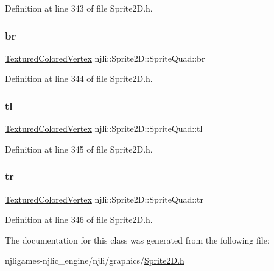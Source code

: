 Definition at line 343 of file Sprite2\+D.\+h.

\mbox{\label{classnjli_1_1_sprite2_d_1_1_sprite_quad_aa7033cec9b83bad9dfcadb89f29dcf94}} 
\subsubsection{\texorpdfstring{br}{br}}
{\footnotesize\ttfamily \mbox{\hyperlink{structnjli_1_1_geometry_1_1_textured_colored_vertex}{Textured\+Colored\+Vertex}} njli\+::\+Sprite2\+D\+::\+Sprite\+Quad\+::br}



Definition at line 344 of file Sprite2\+D.\+h.

\mbox{\label{classnjli_1_1_sprite2_d_1_1_sprite_quad_aecfbaa6fa13750f9fa1347cf36d12f7e}} 
\subsubsection{\texorpdfstring{tl}{tl}}
{\footnotesize\ttfamily \mbox{\hyperlink{structnjli_1_1_geometry_1_1_textured_colored_vertex}{Textured\+Colored\+Vertex}} njli\+::\+Sprite2\+D\+::\+Sprite\+Quad\+::tl}



Definition at line 345 of file Sprite2\+D.\+h.

\mbox{\label{classnjli_1_1_sprite2_d_1_1_sprite_quad_a0eb387285104214c4b47b616a923d48d}} 
\subsubsection{\texorpdfstring{tr}{tr}}
{\footnotesize\ttfamily \mbox{\hyperlink{structnjli_1_1_geometry_1_1_textured_colored_vertex}{Textured\+Colored\+Vertex}} njli\+::\+Sprite2\+D\+::\+Sprite\+Quad\+::tr}



Definition at line 346 of file Sprite2\+D.\+h.



The documentation for this class was generated from the following file\+:\begin{DoxyCompactItemize}
\item 
njligames-\/njlic\+\_\+engine/njli/graphics/\mbox{\hyperlink{_sprite2_d_8h}{Sprite2\+D.\+h}}\end{DoxyCompactItemize}
